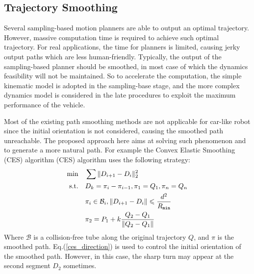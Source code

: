\documentclass[conference, onecolumn]{IEEEtran}
\begin{document}

\subsection{Trajectory Smoothing}
Several sampling-based motion planners are able to output an optimal trajectory\cite{sst}\cite{anytimemotion}. However, massive computation time is required to achieve such optimal trajectory. For real applications, the time for planners is limited, causing jerky output paths which are less human-friendly. Typically, the output of the sampling-based planner should be smoothed, in most case of which the dynamics feasibility will not be maintained. So to accelerate the computation, the simple kinematic model is adopted in the sampling-base stage, and the more complex dynamics model is considered in the late procedures to exploit the maximum performance of the vehicle.

Most of the existing path smoothing methods are not applicable for car-like robot since the initial orientation is not considered, causing the smoothed path unreachable. The proposed approach here aims at solving such phenomenon and to generate a more natural path. For example the Convex Elastic Smoothing (CES)\cite{zhu2015convex} algorithm (CES) algorithm uses the following strategy:
\begin{subequations}\label{ces}
	\begin{align}
		\min \quad & \sum \|D_{i+1}-D_{i}\|_2^2\\
		\textrm{s.t.} \quad & D_{k}=\pi_{i}-\pi_{i-1},\pi_1 = Q_1,\pi_n = Q_n\\
		\quad &  \pi_i \in \mathcal{B}_i ,\|D_{i+1}-D_{i}\| \leqslant \frac{d^2}{R_{\tt min}} \\
		\quad & \pi_2 = P_1 + k\frac{Q_2-Q_1}{\|Q_2-Q_1\|} \label{ces_direction}
	\end{align}
\end{subequations}
Where $\mathcal{B}$ is a collision-free tube along the original trajectory $Q$, and $\pi$ is the smoothed path.
Eq.(\ref{ces_direction}) is used to control the initial orientation of the smoothed path. However, in this case, the sharp turn may appear at the second segment $D_2$ sometimes. 
\end{document}
